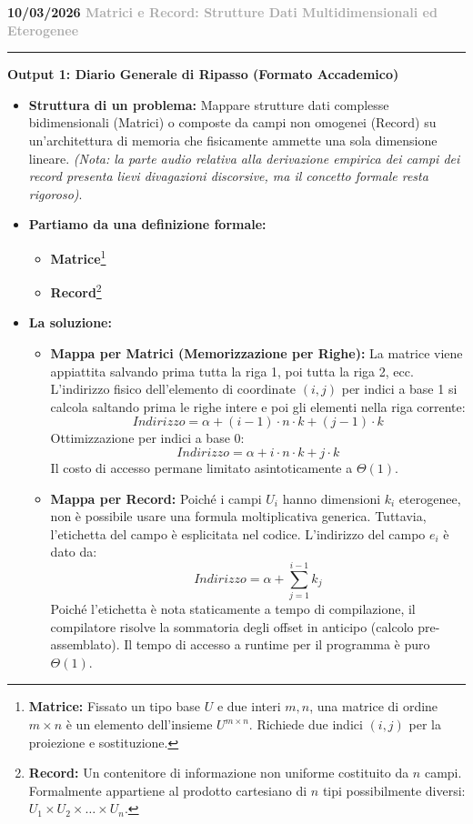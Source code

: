 \documentclass[a4paper, 11pt]{report}
\newcommand{\lezione}[2]{
\vspace{2em}
\noindent\textbf{\Large #1 \hfill \textcolor{darkgray}{#2}}
\vspace{0.5em}
\hrule
\vspace{1.5em}
}
\newcommand{\definizione}[2]{%
\textbf{#1}\footnote{\textbf{#1:} #2}%
}
\begin{document}
\lezione{10/03/2026}{Matrici e Record: Strutture Dati Multidimensionali ed Eterogenee}

\vspace{0.5cm}
\textbf{Output 1: Diario Generale di Ripasso (Formato Accademico)}

\begin{itemize}
    \item \textbf{Struttura di un problema:}
    Mappare strutture dati complesse bidimensionali (Matrici) o composte da campi non omogenei (Record) su un'architettura di memoria che fisicamente ammette una sola dimensione lineare. \textit{(Nota: la parte audio relativa alla derivazione empirica dei campi dei record presenta lievi divagazioni discorsive, ma il concetto formale resta rigoroso)}.

    \item \textbf{Partiamo da una definizione formale:}
    \begin{itemize}
        \item \definizione{Matrice}{Fissato un tipo base $U$ e due interi $m, n$, una matrice di ordine $m \times n$ è un elemento dell'insieme $U^{m \times n}$. Richiede due indici $(i, j)$ per la proiezione e sostituzione.}
        \item \definizione{Record}{Un contenitore di informazione non uniforme costituito da $n$ campi. Formalmente appartiene al prodotto cartesiano di $n$ tipi possibilmente diversi: $U_1 \times U_2 \times \dots \times U_n$.}
    \end{itemize}

    \item \textbf{La soluzione:}
    \begin{itemize}
        \item \textbf{Mappa per Matrici (Memorizzazione per Righe):} La matrice viene appiattita salvando prima tutta la riga 1, poi tutta la riga 2, ecc. L'indirizzo fisico dell'elemento di coordinate $(i, j)$ per indici a base 1 si calcola saltando prima le righe intere e poi gli elementi nella riga corrente:
        \[ Indirizzo = \alpha + (i - 1) \cdot n \cdot k + (j - 1) \cdot k \]
        Ottimizzazione per indici a base 0:
        \[ Indirizzo = \alpha + i \cdot n \cdot k + j \cdot k \]
        Il costo di accesso permane limitato asintoticamente a $\Theta(1)$.

        \item \textbf{Mappa per Record:} Poiché i campi $U_i$ hanno dimensioni $k_i$ eterogenee, non è possibile usare una formula moltiplicativa generica. Tuttavia, l'etichetta del campo è esplicitata nel codice. L'indirizzo del campo $e_i$ è dato da:
        \[ Indirizzo = \alpha + \sum_{j=1}^{i-1} k_j \]
        Poiché l'etichetta è nota staticamente a tempo di compilazione, il compilatore risolve la sommatoria degli offset in anticipo (calcolo pre-assemblato). Il tempo di accesso a runtime per il programma è puro $\Theta(1)$.
    \end{itemize}
\end{itemize}
\end{document}
